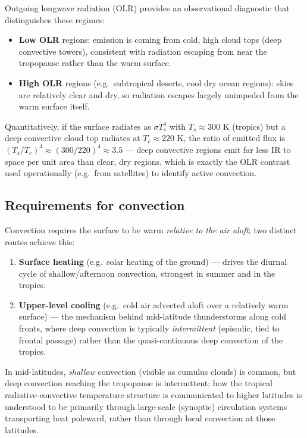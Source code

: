 \documentclass[11pt]{article}
\begin{document}
Outgoing longwave radiation (OLR) provides an observational diagnostic that distinguishes these regimes:
\begin{itemize}[leftmargin=1.4em]
\item \textbf{Low OLR} regions: emission is coming from cold, high cloud tops (deep convective towers), consistent with radiation escaping from near the tropopause rather than the warm surface.
\item \textbf{High OLR} regions (e.g.\ subtropical deserts, cool dry ocean regions): skies are relatively clear and dry, so radiation escapes largely unimpeded from the warm surface itself.
\end{itemize}
Quantitatively, if the surface radiates as $\sigma T_s^4$ with $T_s\approx300$ K (tropics) but a deep convective cloud top radiates at $T_c\approx220$ K, the ratio of emitted flux is $(T_s/T_c)^4 \approx(300/220)^4\approx3.5$ — deep convective regions emit far less IR to space per unit area than clear, dry regions, which is exactly the OLR contrast used operationally (e.g.\ from satellites) to identify active convection.

\subsection{Requirements for convection}
Convection requires the surface to be warm \emph{relative to the air aloft}; two distinct routes achieve this:
\begin{enumerate}[leftmargin=1.4em]
\item \textbf{Surface heating} (e.g.\ solar heating of the ground) — drives the diurnal cycle of shallow/afternoon convection, strongest in summer and in the tropics.
\item \textbf{Upper-level cooling} (e.g.\ cold air advected aloft over a relatively warm surface) — the mechanism behind mid-latitude thunderstorms along cold fronts, where deep convection is typically \emph{intermittent} (episodic, tied to frontal passage) rather than the quasi-continuous deep convection of the tropics.
\end{enumerate}
In mid-latitudes, \emph{shallow} convection (visible as cumulus clouds) is common, but deep convection reaching the tropopause is intermittent; how the tropical radiative-convective temperature structure is communicated to higher latitudes is understood to be primarily through large-scale (synoptic) circulation systems transporting heat poleward, rather than through local convection at those latitudes.
\end{document}
